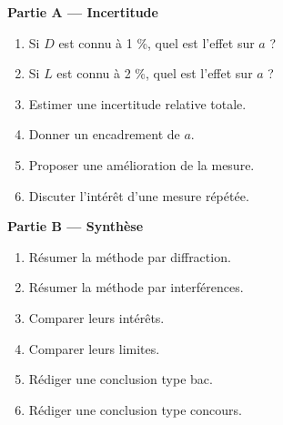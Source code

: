 \documentclass[11pt,a4paper]{article}
\begin{document}
\begin{difficile}
\textbf{Partie A — Incertitude}
\begin{enumerate}
  \item Si $D$ est connu à 1 \%, quel est l'effet sur $a$ ?
  \item Si $L$ est connu à 2 \%, quel est l'effet sur $a$ ?
  \item Estimer une incertitude relative totale.
  \item Donner un encadrement de $a$.
  \item Proposer une amélioration de la mesure.
  \item Discuter l'intérêt d'une mesure répétée.
\end{enumerate}

\textbf{Partie B — Synthèse}
\begin{enumerate}
  \item Résumer la méthode par diffraction.
  \item Résumer la méthode par interférences.
  \item Comparer leurs intérêts.
  \item Comparer leurs limites.
  \item Rédiger une conclusion type bac.
  \item Rédiger une conclusion type concours.
\end{enumerate}
\end{difficile}
\end{document}
